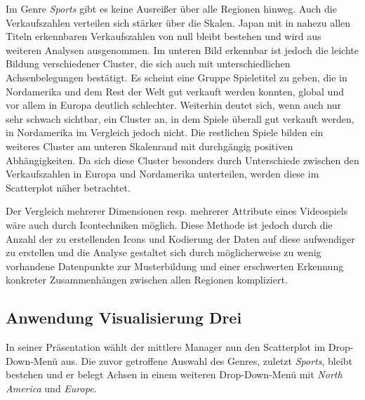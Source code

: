 \documentclass[usegeometry=true]{scrartcl}
\begin{document}
Im Genre \textit{Sports} gibt es keine Ausreißer über alle Regionen hinweg. Auch die Verkaufszahlen verteilen sich stärker über die Skalen. 
Japan mit in nahezu allen Titeln erkennbaren Verkaufszahlen von null bleibt bestehen und wird aus weiteren Analysen ausgenommen.
Im unteren Bild erkennbar ist jedoch die leichte Bildung verschiedener Cluster, die sich auch mit unterschiedlichen Achsenbelegungen bestätigt.
Es scheint eine Gruppe Spieletitel zu geben, die in Nordamerika und dem Rest der Welt gut verkauft werden konnten, global und vor allem in Europa deutlich schlechter.
Weiterhin deutet sich, wenn auch nur sehr schwach sichtbar, ein Cluster an, in dem Spiele überall gut verkauft werden, in Nordamerika im Vergleich jedoch nicht.
Die restlichen Spiele bilden ein weiteres Cluster am unteren Skalenrand mit durchgängig positiven Abhängigkeiten. 
Da sich diese Cluster besonders durch Unterschiede zwischen den Verkaufszahlen in Europa und Nordamerika unterteilen, werden diese im Scatterplot näher betrachtet. 

Der Vergleich mehrerer Dimensionen resp. mehrerer Attribute eines Videospiels wäre auch durch Icontechniken möglich. 
Diese Methode ist jedoch durch die Anzahl der zu erstellenden Icons und Kodierung der Daten auf diese aufwendiger zu erstellen und die Analyse
gestaltet sich durch möglicherweise zu wenig vorhandene Datenpunkte zur Musterbildung und einer erschwerten Erkennung konkreter Zusammenhängen zwischen allen Regionen kompliziert.

\subsection{Anwendung Visualisierung Drei}
In seiner Präsentation wählt der mittlere Manager nun den Scatterplot im Drop-Down-Menü aus.
Die zuvor getroffene Auswahl des Genres, zuletzt \textit{Sports}, bleibt bestehen und 
er belegt Achsen in einem weiteren Drop-Down-Menü mit \textit{North America} und \textit{Europe}.
\end{document}

